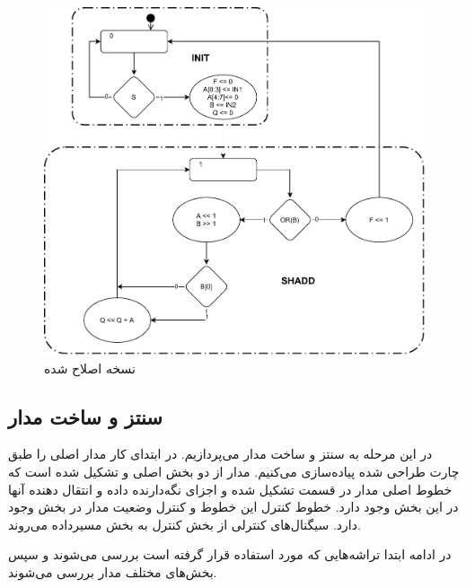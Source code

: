 \documentclass{article}
\begin{document}
\begin{figure}
	\centering
	\includegraphics[scale=0.5]{./graphics/asmv2}
	\caption{نسخه اصلاح شده}
	\label{fig:asmv2}
\end{figure}

\subsection{سنتز و ساخت مدار}
در این مرحله به سنتز و ساخت مدار می‌پردازیم. در ابتدای کار مدار اصلی را طبق چارت طراحی شده پیاده‌سازی می‌کنیم. مدار از دو بخش اصلی  و  تشکیل شده است که خطوط اصلی مدار در قسمت  تشکیل شده و اجزای نگه‌دارنده داده و انتقال دهنده آنها در این بخش وجود دارد. خطوط کنترل این خطوط و کنترل وضعیت مدار در بخش  وجود دارد. سیگنال‌های کنترلی از بخش کنترل به بخش مسیرداده می‌روند.

در ادامه ابتدا تراشه‌هایی که مورد استفاده قرار گرفته است بررسی می‌شوند و سپس بخش‌های مختلف مدار بررسی می‌شوند.
\end{document}
